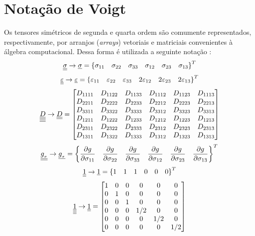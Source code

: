 \section{Notação de Voigt}
Os tensores simétricos de segunda e quarta ordem são comumente representados, respectivamente, por arranjos (\textit{arrays}) vetoriais e matriciais convenientes à álgebra computacional. Dessa forma é utilizada a seguinte notação \cite[p. 682]{Zienkiewicz2005}:
\begin{equation}
	\label{eq:sigmal}
	\underline{\underline \sigma} \rightarrow \underline \sigma = \left\{\sigma_{11}~~~\sigma_{22}~~~\sigma_{33}~~~\sigma_{12}~~~\sigma_{23}~~~\sigma_{13} \right\}^T
\end{equation}
\begin{equation}
	\label{eq:varepsilonl}
	\underline{\underline \varepsilon} \rightarrow \underline{\varepsilon} = \left\{\varepsilon_{11}~~~\varepsilon_{22}~~~\varepsilon_{33}~~~2\varepsilon_{12}~~~2\varepsilon_{23}~~~2\varepsilon_{13} \right\}^T
\end{equation}
\begin{equation}
	\label{eq:Dl}
	\underline{\underline{\underline{\underline D}}} \rightarrow \underline{\underline D} = 
	\begin{bmatrix}
		D_{1111} & D_{1122} & D_{1133}  & D_{1112} & D_{1123} & D_{1113} \\
		D_{2211} & D_{2222}  & D_{2233}  & D_{2212} & D_{2223} & D_{2213}  \\
		D_{3311} & D_{3322} & D_{3333}  & D_{3312} & D_{3323} & D_{3313}  \\
		D_{1211} & D_{1222}	& D_{1233}  & D_{1212} & D_{1223} & D_{1213}  \\
		D_{2311} & D_{2322} & D_{2333} & D_{2312} & D_{2323} & D_{2313}  \\
		D_{1311} & D_{1322}	& D_{1333} & D_{1312} & D_{1323} & D_{1313} 
	\end{bmatrix}
\end{equation}
\begin{equation}
	\label{eq:dgdsl}
	\underline{\underline {g_{_\sigma}}} \rightarrow \underline{g_{_\sigma}} = \left\{\dfrac{\partial g}{\partial \sigma_{11}}~~~\dfrac{\partial g}{\partial \sigma_{22}}~~~\dfrac{\partial g}{\partial \sigma_{33}}~~~\dfrac{\partial g}{\partial \sigma_{12}}~~~\dfrac{\partial g}{\partial \sigma_{23}}~~~\dfrac{\partial g}{\partial \sigma_{13}} \right\}^T
\end{equation}
\begin{equation}
	\label{eq:Uml}
	\underline{\underline 1} \rightarrow \underline{1} = \left\{1~~~1~~~1~~~0~~~0~~~0 \right\}^T
\end{equation}
\begin{equation}
	\label{eq:UmllotimesUll}
	\underline{\underline{\underline{\underline 1}}} \rightarrow \underline{\underline 1} = 
	\begin{bmatrix}
		1 & 0 & 0 & 0 & 0 & 0 \\
		0 & 1 & 0 & 0 & 0 & 0  \\
		0 & 0 & 1 & 0 & 0 & 0  \\
		0 & 0 & 0 & 1/2 & 0 & 0  \\
		0 & 0 & 0 & 0 & 1/2 & 0  \\
		0 & 0 & 0 & 0 & 0 & 1/2 
	\end{bmatrix}
\end{equation}
